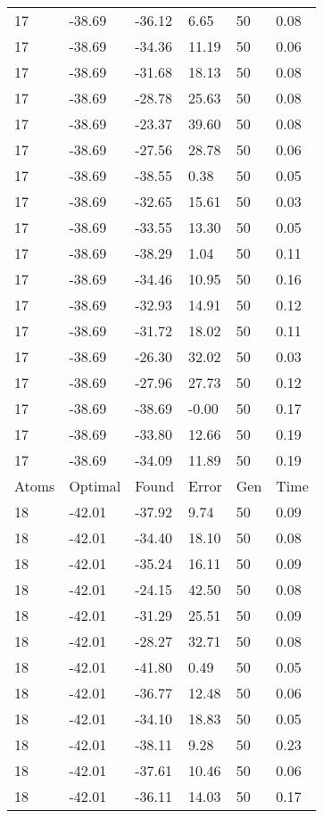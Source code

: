 \documentclass{report}
\begin{document}
\begin{appendix}
\begin{longtable}{llllll}
17 & -38.69 & -36.12 & 6.65 & 50 & 0.08 \\
17 & -38.69 & -34.36 & 11.19 & 50 & 0.06 \\
17 & -38.69 & -31.68 & 18.13 & 50 & 0.08 \\
17 & -38.69 & -28.78 & 25.63 & 50 & 0.08 \\
17 & -38.69 & -23.37 & 39.60 & 50 & 0.08 \\
17 & -38.69 & -27.56 & 28.78 & 50 & 0.06 \\
17 & -38.69 & -38.55 & 0.38 & 50 & 0.05 \\
17 & -38.69 & -32.65 & 15.61 & 50 & 0.03 \\
17 & -38.69 & -33.55 & 13.30 & 50 & 0.05 \\
17 & -38.69 & -38.29 & 1.04 & 50 & 0.11 \\
17 & -38.69 & -34.46 & 10.95 & 50 & 0.16 \\
17 & -38.69 & -32.93 & 14.91 & 50 & 0.12 \\
17 & -38.69 & -31.72 & 18.02 & 50 & 0.11 \\
17 & -38.69 & -26.30 & 32.02 & 50 & 0.03 \\
17 & -38.69 & -27.96 & 27.73 & 50 & 0.12 \\
17 & -38.69 & -38.69 & -0.00 & 50 & 0.17 \\
17 & -38.69 & -33.80 & 12.66 & 50 & 0.19 \\
17 & -38.69 & -34.09 & 11.89 & 50 & 0.19 \\
Atoms & Optimal & Found & Error & Gen & Time \\
18 & -42.01 & -37.92 & 9.74 & 50 & 0.09 \\
18 & -42.01 & -34.40 & 18.10 & 50 & 0.08 \\
18 & -42.01 & -35.24 & 16.11 & 50 & 0.09 \\
18 & -42.01 & -24.15 & 42.50 & 50 & 0.08 \\
18 & -42.01 & -31.29 & 25.51 & 50 & 0.09 \\
18 & -42.01 & -28.27 & 32.71 & 50 & 0.08 \\
18 & -42.01 & -41.80 & 0.49 & 50 & 0.05 \\
18 & -42.01 & -36.77 & 12.48 & 50 & 0.06 \\
18 & -42.01 & -34.10 & 18.83 & 50 & 0.05 \\
18 & -42.01 & -38.11 & 9.28 & 50 & 0.23 \\
18 & -42.01 & -37.61 & 10.46 & 50 & 0.06 \\
18 & -42.01 & -36.11 & 14.03 & 50 & 0.17 \\

\end{longtable}
\end{appendix}
\end{document}
